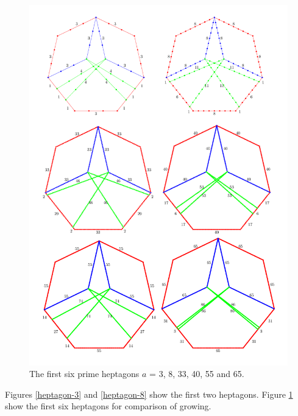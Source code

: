 \documentclass[11pt]{article}
\begin{document}
\begin{figure}[htp]
\centering
\includegraphics[scale=0.78]{gen}
\caption{The first six prime heptagons $a$ = 3, 8, 33, 40, 55 and 65.}
\label{gen}
\end{figure}

Figures \ref{heptagon-3} and \ref{heptagon-8} show the first two heptagons.
Figure \ref{gen} show the first six heptagons for comparison of growing.
\end{document}
